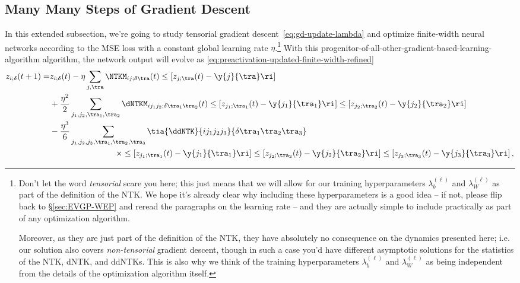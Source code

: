  \subsection{Many Many Steps of Gradient Descent}\label{subsec:real-GD-at-finite-width}
In this extended subsection, we're going to study tensorial gradient descent~\eqref{eq:gd-update-lambda} and optimize finite-width neural networks according to the MSE loss with a constant global learning rate $\eta$.\footnote{
    Don't let the word \emph{tensorial} scare you here; this just means that we will allow for our training hyperparameters $\lambda_b^{(\ell)}$ and $\lambda_W^{(\ell)}$ as part of the definition of the NTK. We hope it's already clear why including these hyperparameters is a good idea -- if not, please flip back to \S\ref{sec:EVGP-WEP} and reread the paragraphs on the learning rate  -- and they are actually simple to include practically as part of any optimization algorithm. 

    Moreover, as they are just part of the definition of the NTK, they have absolutely no consequence on the dynamics presented here; i.e. our solution also covers \emph{non-tensorial} gradient descent, though in such a case you'd have different asymptotic solutions for the statistics of the NTK, dNTK, and ddNTKs. This is also why we think of the training hyperparameters $\lambda_b^{(\ell)}$ and $\lambda_W^{(\ell)}$ as being independent from the details of the optimization algorithm itself.
}
With this progenitor-of-all-other-gradient-based-learning-algorithm algorithm, the network output will evolve as
 \eqref{eq:preactivation-updated-finite-width-refined}
\begin{align}\label{eq:preactivation-update-redux}
z_{i;\delta}(t+1)=&z_{i;\delta}(t)-\eta\sum_{j,\tra}\NTKM_{ij;\delta\tra}(t)\le[z_{j;\tra}(t)-\y{j}{\tra}\ri]\, \\
&+\frac{\eta^2}{2}\sum_{j_1,j_2,\tra_1,\tra_2}\dNTKM_{i j_1j_2;\delta\tra_1\tra_2}(t)\le[z_{j_1;\tra_1}(t)-\y{j_1}{\tra_1}\ri]\le[z_{j_2;\tra_2}(t)-\y{j_2}{\tra_2}\ri]\, \notag \\
&-\frac{\eta^3}{6}\sum_{j_1,j_2,j_3,\tra_1,\tra_2,\tra_3}\tia{\ddNTK}{i j_1j_2j_3}{\delta\tra_1\tra_2\tra_3} \notag \,\\
&\qquad\qquad\qquad\qquad\times\le[z_{j_1;\tra_1}(t)-\y{j_1}{\tra_1}\ri]\le[z_{j_2;\tra_2}(t)-\y{j_2}{\tra_2}\ri]\le[z_{j_3;\tra_3}(t)-\y{j_3}{\tra_3}\ri]
\,  \notag,
\end{align}
